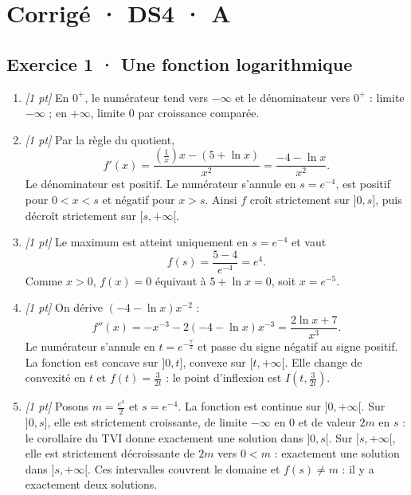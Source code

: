 \ifmxteacher\mxnewpage

\section*{Corrigé · DS4 · A}\label{cor:6-3}

\subsection*{Exercice 1 · Une fonction logarithmique}\begin{enumerate}

\item \textit{[1 pt]} En $0^+$, le numérateur tend vers $-\infty$ et le dénominateur vers $0^+$ : limite $-\infty$ ; en $+\infty$, limite $0$ par croissance comparée.

\item \textit{[1 pt]} Par la règle du quotient,
\[f'(x)=\frac{(\frac{1}{x})x-(5+\ln x)}{x^2}=\frac{-4-\ln x}{x^2}.\]
Le dénominateur est positif. Le numérateur s'annule en $s=e^{-4}$, est positif pour $0<x<s$ et négatif pour $x>s$. Ainsi $f$ croît strictement sur $]0,s]$, puis décroît strictement sur $[s,+\infty[$.

\item \textit{[1 pt]} Le maximum est atteint uniquement en $s=e^{-4}$ et vaut
\[f(s)=\frac{5- 4}{e^{-4}}=e^{4}.\]
Comme $x>0$, $f(x)=0$ équivaut à $5+\ln x=0$, soit $x=e^{-5}$.

\item \textit{[1 pt]} On dérive $(-4-\ln x)x^{-2}$ :
\[f''(x)=-x^{-3}-2(-4-\ln x)x^{-3}=\frac{2\ln x+7}{x^3}.\]
Le numérateur s'annule en $t=e^{-\frac{7}{2}}$ et passe du signe négatif au signe positif. La fonction est concave sur $]0,t]$, convexe sur $[t,+\infty[$. Elle change de convexité en $t$ et $f(t)=\frac{3}{2t}$ : le point d'inflexion est $I(t,\frac{3}{2t})$.

\item \textit{[1 pt]} Posons $m=\frac{e^{4}}{2}$ et $s=e^{-4}$. La fonction est continue sur $]0,+\infty[$. Sur $]0,s]$, elle est strictement croissante, de limite $-\infty$ en $0$ et de valeur $2m$ en $s$ : le corollaire du TVI donne exactement une solution dans $]0,s[$. Sur $[s,+\infty[$, elle est strictement décroissante de $2m$ vers $0<m$ : exactement une solution dans $]s,+\infty[$. Ces intervalles couvrent le domaine et $f(s)\ne m$ : il y a exactement deux solutions.

\end{enumerate}

